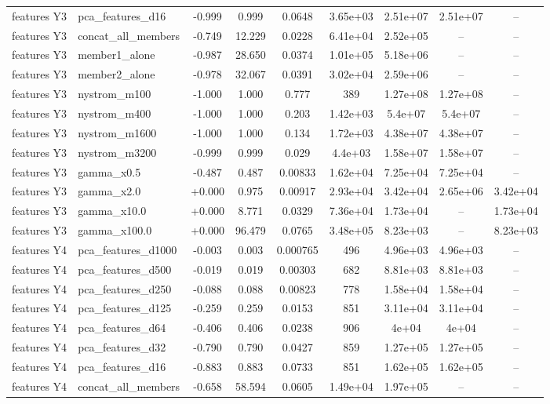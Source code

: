 \begin{tabular}{llccccccc}
features Y3 & pca\_features\_d16 & -0.999 & 0.999 & 0.0648 & 3.65e+03 & 2.51e+07 & 2.51e+07 & -- \\
features Y3 & concat\_all\_members & -0.749 & 12.229 & 0.0228 & 6.41e+04 & 2.52e+05 & -- & -- \\
features Y3 & member1\_alone & -0.987 & 28.650 & 0.0374 & 1.01e+05 & 5.18e+06 & -- & -- \\
features Y3 & member2\_alone & -0.978 & 32.067 & 0.0391 & 3.02e+04 & 2.59e+06 & -- & -- \\
features Y3 & nystrom\_m100 & -1.000 & 1.000 & 0.777 & 389 & 1.27e+08 & 1.27e+08 & -- \\
features Y3 & nystrom\_m400 & -1.000 & 1.000 & 0.203 & 1.42e+03 & 5.4e+07 & 5.4e+07 & -- \\
features Y3 & nystrom\_m1600 & -1.000 & 1.000 & 0.134 & 1.72e+03 & 4.38e+07 & 4.38e+07 & -- \\
features Y3 & nystrom\_m3200 & -0.999 & 0.999 & 0.029 & 4.4e+03 & 1.58e+07 & 1.58e+07 & -- \\
features Y3 & gamma\_x0.5 & -0.487 & 0.487 & 0.00833 & 1.62e+04 & 7.25e+04 & 7.25e+04 & -- \\
features Y3 & gamma\_x2.0 & +0.000 & 0.975 & 0.00917 & 2.93e+04 & 3.42e+04 & 2.65e+06 & 3.42e+04 \\
features Y3 & gamma\_x10.0 & +0.000 & 8.771 & 0.0329 & 7.36e+04 & 1.73e+04 & -- & 1.73e+04 \\
features Y3 & gamma\_x100.0 & +0.000 & 96.479 & 0.0765 & 3.48e+05 & 8.23e+03 & -- & 8.23e+03 \\
features Y4 & pca\_features\_d1000 & -0.003 & 0.003 & 0.000765 & 496 & 4.96e+03 & 4.96e+03 & -- \\
features Y4 & pca\_features\_d500 & -0.019 & 0.019 & 0.00303 & 682 & 8.81e+03 & 8.81e+03 & -- \\
features Y4 & pca\_features\_d250 & -0.088 & 0.088 & 0.00823 & 778 & 1.58e+04 & 1.58e+04 & -- \\
features Y4 & pca\_features\_d125 & -0.259 & 0.259 & 0.0153 & 851 & 3.11e+04 & 3.11e+04 & -- \\
features Y4 & pca\_features\_d64 & -0.406 & 0.406 & 0.0238 & 906 & 4e+04 & 4e+04 & -- \\
features Y4 & pca\_features\_d32 & -0.790 & 0.790 & 0.0427 & 859 & 1.27e+05 & 1.27e+05 & -- \\
features Y4 & pca\_features\_d16 & -0.883 & 0.883 & 0.0733 & 851 & 1.62e+05 & 1.62e+05 & -- \\
features Y4 & concat\_all\_members & -0.658 & 58.594 & 0.0605 & 1.49e+04 & 1.97e+05 & -- & -- \\

\end{tabular}

